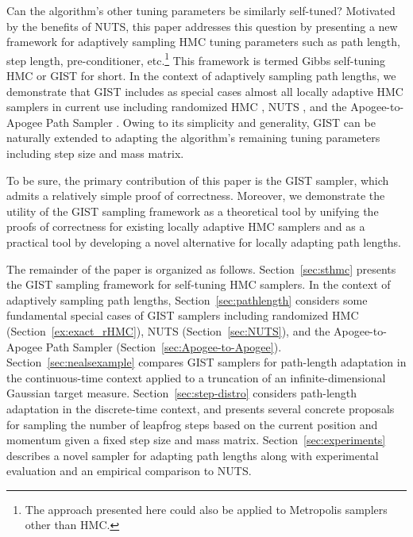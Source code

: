 \documentclass[letterpaper,11pt]{article}
\theoremstyle{plain}%
\theoremstyle{remark}
\begin{document}
Can the algorithm's other tuning parameters  be similarly self-tuned?   Motivated by the benefits of NUTS, this paper addresses this question by presenting a new framework for adaptively sampling HMC tuning parameters such as  path length, step length, pre-conditioner, etc.\footnote{The approach presented here could also be applied to Metropolis samplers other than HMC.}  This framework is termed Gibbs self-tuning HMC or GIST for short.  In the context of adaptively sampling path lengths,  we demonstrate that GIST includes as special cases almost all locally adaptive HMC samplers in current use including randomized HMC \cite{BoSa2017,BoEb2022}, NUTS \cite{HoGe2014,betancourt2017conceptual}, and the Apogee-to-Apogee Path Sampler \cite{SherlockUrbasLudkin2023Apogee}.  Owing to its simplicity and generality, GIST can be naturally extended to adapting the algorithm's remaining tuning parameters including step size and mass matrix.

To be sure, the primary contribution of this paper is the GIST sampler, which admits a relatively simple proof of correctness.  Moreover, we demonstrate the utility of the GIST sampling framework as a theoretical tool by unifying the proofs of correctness for existing locally adaptive HMC samplers and as a practical tool by developing a novel alternative for locally adapting path lengths.

The remainder of the paper is organized as follows.  
Section~\ref{sec:sthmc} presents the GIST sampling framework for  self-tuning HMC samplers.  In the context of adaptively sampling path lengths, Section~\ref{sec:pathlength} considers some fundamental special cases of  GIST samplers including randomized HMC (Section~\ref{ex:exact_rHMC}), NUTS (Section~\ref{sec:NUTS}), and the Apogee-to-Apogee Path Sampler (Section~\ref{sec:Apogee-to-Apogee}).  Section~\ref{sec:nealsexample} compares GIST samplers for path-length adaptation in the continuous-time context applied to a truncation of an infinite-dimensional Gaussian target measure.  Section~\ref{sec:step-distro} considers path-length adaptation in the discrete-time context, and presents several concrete proposals for sampling the number of leapfrog steps based on the current position and momentum given a fixed step size and mass matrix.  Section~\ref{sec:experiments} describes a novel sampler for adapting path lengths along with experimental evaluation and an empirical comparison to NUTS.
\end{document}
